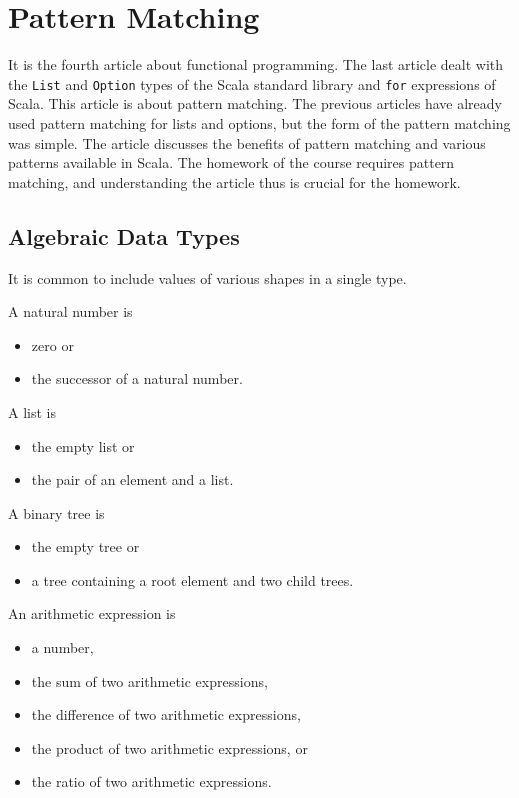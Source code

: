 \setchapterpreamble[u]{\margintoc}
\chapter{Pattern Matching}

It is the fourth article about functional programming. The last article dealt
with the \verb!List! and \verb!Option! types of the Scala standard library and
\verb!for! expressions of Scala. This article is about pattern matching. The
previous articles have already used pattern matching for lists and options, but
the form of the pattern matching was simple. The article discusses the benefits
of pattern matching and various patterns available in Scala. The homework of the
course requires pattern matching, and understanding the article thus is crucial
for the homework.

\section{Algebraic Data Types}

It is common to include values of various shapes in a single type.

A natural number is

\begin{itemize}
\item zero or
\item the successor of a natural number.
\end{itemize}

A list is

\begin{itemize}
\item the empty list or
\item the pair of an element and a list.
\end{itemize}

A binary tree is

\begin{itemize}
\item the empty tree or
\item a tree containing a root element and two child trees.
\end{itemize}

An arithmetic expression is

\begin{itemize}
\item a number,
\item the sum of two arithmetic expressions,
\item the difference of two arithmetic expressions,
\item the product of two arithmetic expressions, or
\item the ratio of two arithmetic expressions.
\end{itemize}

